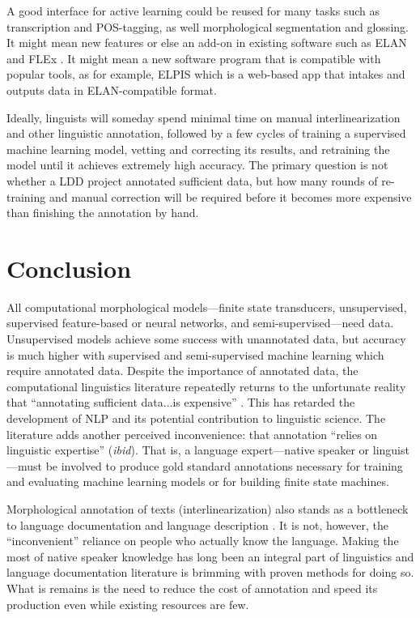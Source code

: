 \documentclass[12pt]{article}
\begin{document}
A good interface for active learning could be reused for many tasks such as transcription and POS-tagging, as well morphological segmentation and glossing. It might mean new features or else an add-on in existing software such as ELAN \cite{auer_elan_2010} and FLEx \cite{Black06FLEX}. It might mean a new software program that is compatible with popular tools, as for example, ELPIS which is a web-based app that intakes and outputs data in ELAN-compatible format.  

Ideally, linguists will someday spend minimal time on manual interlinearization and other linguistic annotation, followed by a few cycles of training a supervised machine learning model, vetting and correcting its results, and retraining the model until it achieves extremely high accuracy. The primary question is not whether a LDD project annotated sufficient data, but how many rounds of re-training and manual correction will be required before it becomes more expensive than finishing the annotation by hand. 

\section{Conclusion}

All computational morphological models—finite state transducers, unsupervised, supervised feature-based or neural networks, and semi-supervised---need data. Unsupervised models achieve some success with unannotated data, but accuracy is much higher with supervised and semi-supervised machine learning which require annotated data. Despite the importance of annotated data, the computational linguistics literature repeatedly returns to the unfortunate reality that ``annotating sufficient data...is expensive'' \cite[page 1954]{cotterell_cross-lingual_2017}. This has retarded the development of NLP and its potential contribution to linguistic science. The literature adds another perceived inconvenience: that annotation ``relies on linguistic expertise'' (\textit{ibid}). That is, a language expert—native speaker or linguist—must be involved to produce gold standard annotations necessary for training and evaluating machine learning models or for building finite state machines.

Morphological annotation of texts (interlinearization) also stands as a bottleneck to language documentation and language description \cite{bird_documentary_2015,bettinson_developing_2017,holton_developing_2017}. It is not, however, the ``inconvenient'' reliance on people who actually know the language. Making the most of native speaker knowledge has long been an integral part of linguistics and language documentation literature is brimming with proven methods for doing so. What is remains is the need to reduce the cost of annotation and speed its production even while existing resources are few. 
\end{document}
